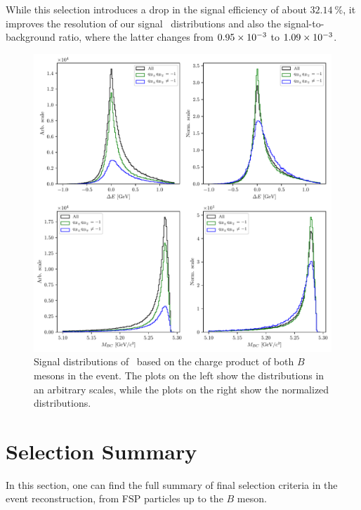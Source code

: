 While this selection introduces a drop in the signal efficiency of about $32.14~\%$, it improves the resolution of our signal \vars~distributions and also the signal-to-background ratio, where the latter changes from $0.95\times 10^{-3}$ to $1.09\times 10^{-3}$.

\begin{figure}[H]
	\centering
	\captionsetup{width=0.8\linewidth}
	\includegraphics[width=\linewidth]{fig/sig_categ}
	\caption{Signal distributions of \vars~based on the charge product of both $B$ mesons in the event. The plots on the left show the distributions in an arbitrary scales, while the plots on the right show the normalized distributions.}
	\label{fig:sig_categ}
\end{figure}

\newpage
\section{Selection Summary}
\label{s:ss}
In this section, one can find the full summary of final selection criteria in the event reconstruction, from FSP particles up to the $B$ meson.

